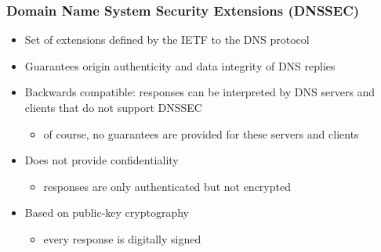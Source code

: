 \documentclass[final]{article}
\begin{document}
\subsubsection*{Domain Name System Security Extensions (DNSSEC)}
\begin{itemize}[nosep]
    \item Set of extensions defined by the IETF to the DNS protocol
    \item Guarantees origin authenticity and data integrity of DNS replies
    \item Backwards compatible: responses can be interpreted by DNS servers and clients that do not support DNSSEC
          \begin{itemize}[nosep]
              \item of course, no guarantees are provided for these servers and clients
          \end{itemize}
    \item Does not provide confidentiality
          \begin{itemize}[nosep]
              \item responses are only authenticated but not encrypted
          \end{itemize}
    \item Based on public-key cryptography
          \begin{itemize}[nosep]
              \item every response is digitally signed
          \end{itemize}
\end{itemize}
\end{document}
